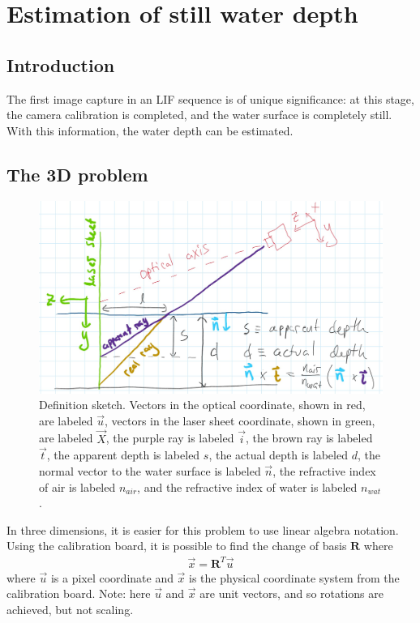 \chapter{Estimation of still water depth}
%
\section{Introduction}
\par
The first image capture in an LIF sequence is of unique significance: at this stage, the camera calibration is completed, and the water surface is completely still.
With this information, the water depth can be estimated.
%
\section{The 3D problem}
\begin{figure}[H]
	\centering
	\includegraphics[width=0.75 \linewidth]{../images/depth-sketch.jpg}
	\caption{Definition sketch. Vectors in the optical coordinate, shown in red, are labeled $\vec{u}$, vectors in the laser sheet coordinate, shown in green, are labeled $\vec{X}$, the purple ray is labeled $\vec{i}$, the brown ray is labeled $\vec{t}$, the apparent depth is labeled $s$, the actual depth is labeled $d$, the normal vector to the water surface is labeled $\vec{n}$, the refractive index of air is labeled $n_{air}$, and the refractive index of water is labeled $n_{wat}$.}
	\label{fig:depth_example}
\end{figure}
\par
In three dimensions, it is easier for this problem to use linear algebra notation.
Using the calibration board, it is possible to find the change of basis $\boldsymbol{R}$ where
\begin{gather*}
	\vec{x} = \boldsymbol{R}^T \vec{u}
\end{gather*}
where $\vec{u}$ is a pixel coordinate and $\vec{x}$ is the physical coordinate system from the calibration board.
Note: here $\vec{u}$ and $\vec{x}$ are unit vectors, and so rotations are achieved, but not scaling.
